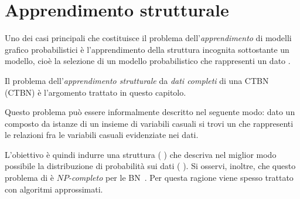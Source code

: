 
\chapter{Apprendimento strutturale}
\label{cap:structurallearning}
Uno dei casi principali che costituisce il problema dell'\emph{apprendimento} di modelli grafico probabilistici è l'apprendimento della struttura incognita sottostante un modello, cioè la selezione di un modello probabilistico che rappresenti un dato \emph{}. %

Il problema dell'\emph{apprendimento strutturale} da \emph{dati completi} di una \acl{CTBN} (\acs{CTBN}) è l'argomento trattato in questo capitolo.

Questo problema può essere informalmente descritto nel seguente modo: dato un \emph{} composto da istanze di un insieme di variabili casuali si trovi un  che rappresenti le relazioni fra le variabili casuali evidenziate nei dati. %

L'obiettivo è quindi indurre una struttura (\ie{} ) che descriva nel miglior modo possibile la distribuzione di probabilità sui dati (\ie{} \emph{}). Si osservi, inoltre, che questo problema di  è \emph{$NP$-completo} per le \acl{BN}~\citep{Chickering1994,Chickering2004}. Per questa ragione viene spesso trattato con algoritmi approssimati. %

